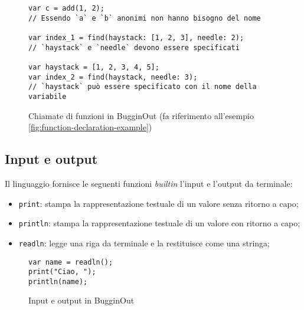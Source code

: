 \begin{figure}[H]
	\centering
	\begin{verbatim}
var c = add(1, 2);
// Essendo `a` e `b` anonimi non hanno bisogno del nome

var index_1 = find(haystack: [1, 2, 3], needle: 2);
// `haystack` e `needle` devono essere specificati

var haystack = [1, 2, 3, 4, 5];
var index_2 = find(haystack, needle: 3);
// `haystack` può essere specificato con il nome della variabile
	\end{verbatim}
	\caption{Chiamate di funzioni in BugginOut (fa riferimento all'esempio \ref{fig:function-declaration-example})}
	\label{fig:function-call-example}
\end{figure}

\subsection{Input e output}
\label{ssec:input-e-output}

Il linguaggio fornisce le seguenti funzioni \textit{builtin} l'input e l'output da terminale:
\begin{itemize}
	\item \texttt{print}: stampa la rappresentazione testuale di un valore senza ritorno a capo;
	\item \texttt{println}: stampa la rappresentazione testuale di un valore con ritorno a capo;
	\item \texttt{readln}: legge una riga da terminale e la restituisce come una stringa;
\end{itemize}

\begin{figure}[H]
	\centering
	\begin{verbatim}
var name = readln();
print("Ciao, ");
println(name);
	\end{verbatim}
	\caption{Input e output in BugginOut}
	\label{fig:input-output-example}
\end{figure}
